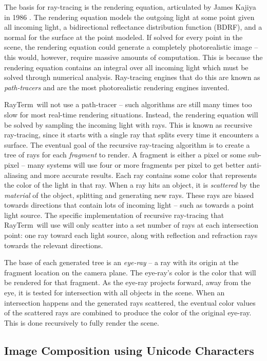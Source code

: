 \documentclass[11pt]{article}
\newcommand{\name}{{\sc RayTerm}}
\begin{document}
The basis for ray-tracing is the rendering equation, articulated by James Kajiya in 1986 \cite{kajiya1986rendering}.
The rendering equation models the outgoing light at some point given all incoming light, a bidirectional reflectance distribution function (BDRF), and a normal for the surface at the point modeled.
If solved for every point in the scene, the rendering equation could generate a completely photorealistic image -- this would, however, require massive amounts of computation.
This is because the rendering equation contains an integral over all incoming light which must be solved through numerical analysis.
Ray-tracing engines that do this are known as {\it path-tracers} and are the most photorealistic rendering engines invented.

\name\ will not use a path-tracer -- such algorithms are still many times too slow for most real-time rendering situations.
Instead, the rendering equation will be solved by sampling the incoming light with rays.
This is known as recursive ray-tracing, since it starts with a single ray that splits every time it encounters a surface.
The eventual goal of the recursive ray-tracing algorithm is to create a tree of rays for each {\it fragment} to render.
A fragment is either a pixel or some sub-pixel -- many systems will use four or more fragments per pixel to get better anti-aliasing and more accurate results.
Each ray contains some color that represents the color of the light in that ray.
When a ray hits an object, it is {\it scattered} by the {\it material} of the object, splitting and generating new rays.
These rays are biased towards directions that contain lots of incoming light -- such as towards a point light source.
The specific implementation of recursive ray-tracing that \name\ will use will only scatter into a set number of rays at each intersection point: one ray toward each light source, along with reflection and refraction rays towards the relevant directions.

The base of each generated tree is an {\it eye-ray} -- a ray with its origin at the fragment location on the camera plane.
The eye-ray's color is the color that will be rendered for that fragment.
As the eye-ray projects forward, away from the eye, it is tested for intersection with all objects in the scene.
When an intersection happens and the generated rays scattered, the eventual color values of the scattered rays are combined to produce the color of the original eye-ray.
This is done recursively to fully render the scene.


\subsection{Image Composition using Unicode Characters}
\label{sec:introduction:unicode}
\end{document}
